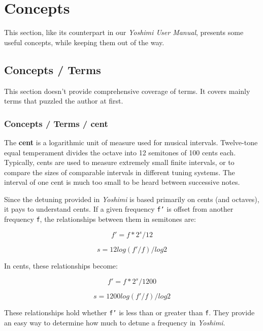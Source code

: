 %
%
%

\section{Concepts}
\label{sec:concepts}

   This section, like its counterpart in our \textsl{Yoshimi User Manual},
   presents some useful concepts, while keeping them out of the way.

\subsection{Concepts / Terms}
\label{subsec:concepts_terms}

   This section doesn't provide comprehensive coverage of terms.  It
   covers mainly terms that puzzled the author at first.

\subsubsection{Concepts / Terms / cent}
\label{subsubsec:concepts_terms_cent}

   The \textbf{cent}
   is a logarithmic unit of measure used for musical
   intervals.  Twelve-tone equal temperament divides the octave into 12
   semitones of 100 cents each. Typically, cents are used to measure
   extremely small finite intervals, or to compare the sizes of comparable
   intervals in different tuning systems.
   The interval of one cent is much too small to be heard between
   successive notes.

   Since the detuning provided in \textsl{Yoshimi} is based primarily on
   cents (and octaves), it pays to understand cents.  If a given frequency
   \texttt{f'} is offset from another frequency \texttt{f}, the
   relationships between them in semitones are:

   \[f' = f * 2^s/12\]

   \[s = 12 log (f'/f) / log 2\]

   In cents, these relationships become:

   \[f' = f * 2^s/1200\]

   \[s = 1200 log (f'/f) / log 2\]

   These relationships hold whether \texttt{f'} is less than or greater than
   \texttt{f}.  They provide an easy way to determine how much to detune a
   frequency in \textsl{Yoshimi}.

